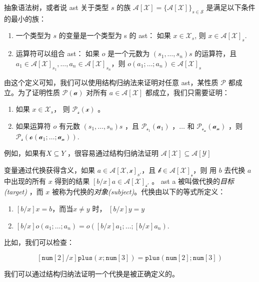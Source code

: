 抽象语法树，或者说 ast 关于类型 \(s\) 的族
\(\mathcal{A}[\mathcal{X}]=\{\mathcal{A}[\mathcal{X}]\}_{s\in\mathcal{S}}\)
是满足以下条件的最小的族：

\begin{enumerate}
\def\labelenumi{\arabic{enumi}.}
\item
  一个类型为 \(s\) 的变量是一个类型为 s 的 ast： 如果
  \(x\in \mathcal{X}_s\), 则 \(x \in \mathcal{A[X]}_s\).
\item
  运算符可以组合 ast： 如果 \(o\) 是一个元数为 \((s_1,\dots, s_n)s\)
  的运算符，且
  \(a_1\in \mathcal{A[X]}_{s_1},\dots,a_n\in\mathcal{A[X]}_{s_n}\)，则
  \(o(a_1;\dots ;a_n)\in\mathcal{A[X]}_s\)
\end{enumerate}

由这个定义可知，我们可以使用结构归纳法来证明对任意 ast，某性质
\(\mathcal{P}\) 都成立。为了证明性质 \(\mathcal{P(a)}\) 对所有
\(a\in\mathcal{A[X]}\) 都成立，我们只需要证明：

\begin{enumerate}
\def\labelenumi{\arabic{enumi}.}
\item
  如果 \(x\in\mathcal{X}_s\)， 则 \(\mathcal{P_s(x)}\) 。
\item
  如果运算符 \(o\) 有元数 \((s_1,\dots, s_n)s\) ，且
  \(\mathcal{P_{s_1}(a_1)}\) ，\(\dots\) 和 \(\mathcal{P_{s_n}(a_n)}\)
  ，则 \(\mathcal{P_s(o(a_1;\dots ;a_n))}\).
\end{enumerate}

例如，如果有\(X\subseteq Y\) ，很容易通过结构归纳法证明
\(\mathcal{A[X]\subseteq A[Y]}\)

变量通过代换获得含义，如果 \(a\in\mathcal{A[X,x]}_{s'}\)，且
\(\mathcal{b\in A[X]_s}\)，则 用 \(b\) 去代换 \(a\) 中出现的所有 \(x\)
得到的结果 \([b/x]a\in \mathcal{A[X]_{s'}}\) 。 ast a
被叫做代换的\emph{目标(target)} ，而 \(x\)
被称为代换的\emph{对象(subject)}。代换由以下的等式所定义：

\begin{enumerate}
\def\labelenumi{\arabic{enumi}.}
\item
  \([b/x]x=b\)，而当\(x\neq y\) 时， \([b/x]y=y\) 
\item
  \([b/x]o(a_1;\dots;a_n)=o([b/x]a_1;\dots ;[b/x]a_n)\).
\end{enumerate}

比如，我们可以检查：

\[[\texttt{num}[2]/x]\texttt{plus}(x;\texttt{num}[3])=\texttt{plus}(\texttt{num}[2];\texttt{num}[3])\]

我们可以通过结构归纳法证明一个代换是被正确定义的。

